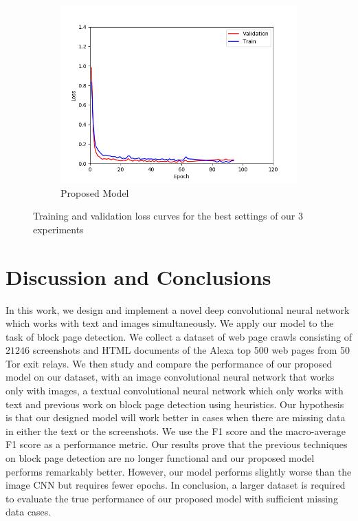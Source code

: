 \documentclass{article} %
\begin{document}
\begin{figure}
\begin{subfigure}[b]{0.3\textwidth}
        \centering
        \includegraphics[width=\textwidth]{model_val_train.png}
        \caption{Proposed Model}
        \label{fig:model_loss}
    \end{subfigure}
    \caption{Training and validation loss curves for the best settings of our $3$ experiments}
    \label{fig:validationloss}
\end{figure}

 
\section{Discussion and Conclusions}
\label{sec:discussion}
In this work, we design and implement a novel deep convolutional neural network which works with text and images simultaneously. We apply our model to the task of block page detection. We collect a dataset of web page crawls consisting of $21246$ screenshots and HTML documents of the Alexa top 500 web pages from 50 Tor exit relays. We then study and compare the performance of our proposed model on our dataset, with an image convolutional neural network that works only with images, a textual convolutional neural network which only works with text and previous work on block page detection using heuristics. Our hypothesis is that our designed model will work better in cases when there are missing data in either the text or the screenshots. We use the F1 score and the macro-average F1 score as a performance metric. Our results prove that the previous techniques on block page detection are no longer functional and our proposed model performs remarkably better. However, our model performs slightly worse than the image CNN but requires fewer epochs. In conclusion, a larger dataset is required to evaluate the true performance of our proposed model with sufficient missing data cases.
\end{document}
